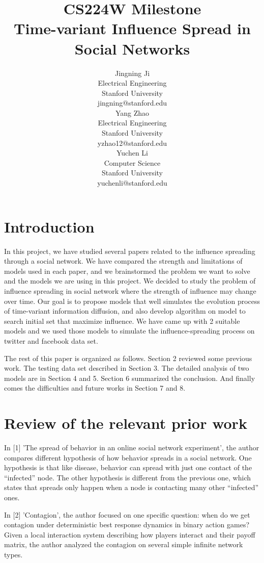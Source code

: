 \documentclass{article}
\title{CS224W Milestone\\ Time-variant Influence Spread in Social Networks}
\author{Jingning Ji \\
  Electrical Engineering \\
  Stanford University \\
  {jingning@stanford.edu} \\\And
  Yang Zhao \\
  Electrical Engineering \\
  Stanford University \\
  {yzhao12@stanford.edu} \\\And
  Yuchen Li \\
  Computer Science \\
  Stanford University \\
  {yuchenli@stanford.edu} \\}
\date{}
\begin{document}
\maketitle

\section{Introduction}
In this project, we have studied several papers related to the influence spreading through a social network. We have compared the strength and limitations of models used in each paper, and we brainstormed the problem we want to solve and the models we are using in this project. We decided to study the problem of influence spreading in social network where the strength of influence may change over time. Our goal is to propose models that well simulates the evolution process of time-variant information diffusion, and also develop algorithm on model to search initial set that maximize influence. We have came up with 2 suitable models and we used those models to simulate the influence-spreading process on twitter and facebook data set.

The rest of this paper is organized as follows. Section 2 reviewed some previous work. The testing data set described in Section 3. The detailed analysis of two models are in Section 4 and 5. Section 6 summarized the conclusion. And finally comes the difficulties and future works in Section 7 and 8.

\section{Review of the relevant prior work}

In [1] 'The spread of behavior in an online social network experiment', the author compares different hypothesis of how behavior spreads in a social network. One hypothesis is that like disease, behavior can spread with just one contact of the “infected” node. The other hypothesis is different from the previous one, which states that spreads only happen when a node is contacting many other “infected” ones. 

In [2] 'Contagion', the author focused on one specific question: when do we get contagion under deterministic best response dynamics in binary action games? Given a local interaction system describing how players interact and their payoff matrix, the author analyzed the contagion on several simple infinite network types.
\end{document}
